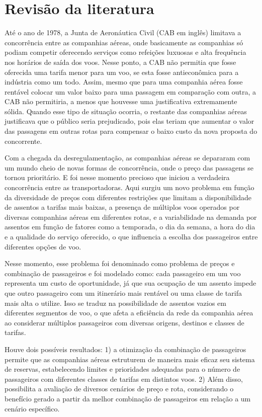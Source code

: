 \chapter{Revisão da literatura }

Até o ano de 1978, a Junta de Aeronáutica Civil (CAB em inglês) limitava a concorrência entre as companhias aéreas, onde basicamente as companhias só podiam competir oferecendo serviços como refeições luxuosas e alta frequência nos horários de saída dos voos. Nesse ponto, a CAB não permitia que fosse oferecida uma tarifa menor para um voo, se esta fosse antieconômica para a indústria como um todo. Assim, mesmo que para uma companhia aérea fosse rentável colocar um valor baixo para uma passagem em comparação com outra, a CAB não permitiria, a menos que houvesse uma justificativa extremamente sólida. Quando esse tipo de situação ocorria, o restante das companhias aéreas justificava que o público seria prejudicado, pois elas teriam que aumentar o valor das passagens em outras rotas para compensar o baixo custo da nova proposta do concorrente.

Com a chegada da desregulamentação, as companhias aéreas se depararam com um mundo cheio de novas formas de concorrência, onde o preço das passagens se tornou prioritário. E foi nesse momento precioso que iniciou a verdadeira concorrência entre as transportadoras. Aqui surgiu um novo problema em função da diversidade de preços com diferentes restrições que limitam a disponibilidade de assentos a tarifas mais baixas, a presença de múltiplos voos operados por diversas companhias aéreas em diferentes rotas, e a variabilidade na demanda por assentos em função de fatores como a temporada, o dia da semana, a hora do dia e a qualidade do serviço oferecido, o que influencia a escolha dos passageiros entre diferentes opções de voo.

Nesse momento, esse problema foi denominado como problema de preços e combinação de passageiros e foi modelado como: cada passageiro em um voo representa um custo de oportunidade, já que sua ocupação de um assento impede que outro passageiro com um itinerário mais rentável ou uma classe de tarifa mais alta o utilize. Isso se traduz na possibilidade de assentos vazios em diferentes segmentos de voo, o que afeta a eficiência da rede da companhia aérea ao considerar múltiplos passageiros com diversas origens, destinos e classes de tarifas.

Houve dois possíveis resultados: 1) a otimização da combinação de passageiros permite que as companhias aéreas estruturem de maneira mais eficaz seu sistema de reservas, estabelecendo limites e prioridades adequadas para o número de passageiros com diferentes classes de tarifas em distintos voos. 2) Além disso, possibilita a avaliação de diversos cenários de preço e rota, considerando o benefício gerado a partir da melhor combinação de passageiros em relação a um cenário específico.

